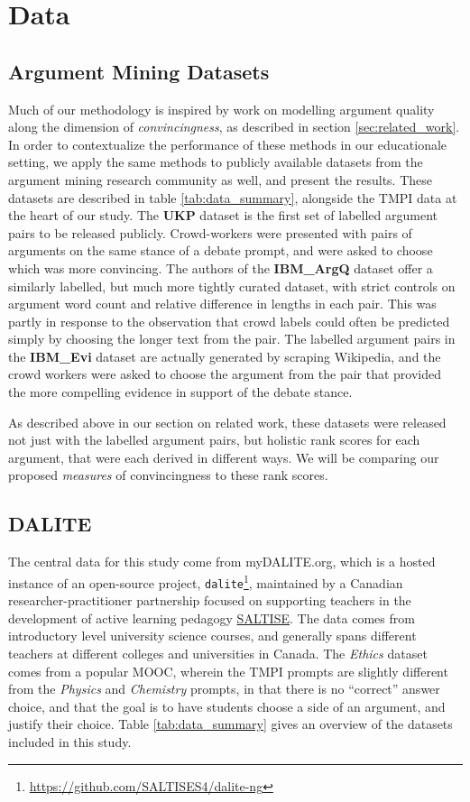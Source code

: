 \documentclass[notitlepage,12pt]{jedm}
\begin{document}
\section{Data}\label{sec:datasets}

\subsection{Argument Mining Datasets}
Much of our methodology is inspired by work on modelling argument quality along 
the dimension of \textit{convincingness}, as described in section 
\ref{sec:related_work}. 
In order to contextualize the performance of these methods in our educationale 
setting, we apply the same methods to publicly available datasets from the 
argument mining research community as well, and present the results. 
These datasets are described in table \ref{tab:data_summary}, alongside the 
TMPI data at the heart of our study. 
The \textbf{UKP} dataset\cite{habernal_which_2016} is the first set of labelled 
argument pairs to be released publicly.
Crowd-workers were presented with pairs of arguments on the same stance of a 
debate prompt, and were asked to choose which was more convincing.
The authors of the \textbf{IBM\_ArgQ} dataset\cite{toledo_automatic_2019} offer 
a similarly labelled, but much more tightly curated dataset, with strict 
controls on argument word count and relative difference in lengths in each pair.
This was partly in response to the observation that crowd labels could often be 
predicted simply by choosing the longer text from the pair.
The labelled argument pairs in the \textbf{IBM\_Evi} dataset 
\cite{gleize_are_2019} are actually generated by scraping Wikipedia, and the 
crowd workers were asked to choose the argument from the pair that provided the 
more compelling evidence in support of the debate stance.

As described above in our section on related work, these datasets were released 
not just with the labelled argument pairs, but holistic rank scores for each 
argument, that were each derived in different ways. 
We will be comparing our proposed \textit{measures} of convincingness to these 
rank scores.


\subsection{DALITE}
The central data for this study come from myDALITE.org, which is a hosted 
instance of an open-source project, 
\verb|dalite|\footnote{\url{https://github.com/SALTISES4/dalite-ng}}, 
maintained by a Canadian researcher-practitioner partnership focused on 
supporting teachers in the development of active learning pedagogy 
\href{saltise.ca}{SALTISE}.
The data comes from introductory level university science courses, and 
generally spans different teachers at different colleges and universities in 
Canada. 
The \textit{Ethics} dataset comes from a popular MOOC, wherein the TMPI prompts 
are slightly different from the \textit{Physics} and \textit{Chemistry} 
prompts, in that there is no ``correct'' answer choice, and that the goal is to 
have students choose a side of an argument, and justify their choice.
Table \ref{tab:data_summary} gives an overview of the datasets included in this 
study.
\end{document}
